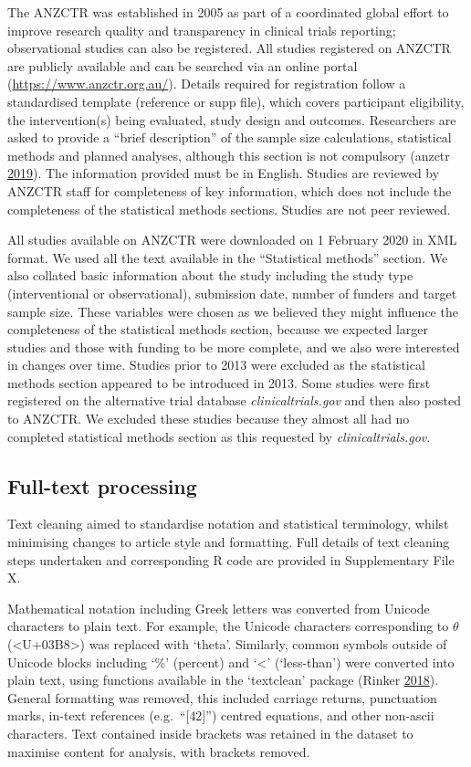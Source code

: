 \documentclass[
]{article}
\begin{document}
The ANZCTR was established in 2005 as part of a coordinated global
effort to improve research quality and transparency in clinical trials
reporting; observational studies can also be registered. All studies
registered on ANZCTR are publicly available and can be searched via an
online portal (\url{https://www.anzctr.org.au/}). Details required for
registration follow a standardised template (reference or supp file),
which covers participant eligibility, the intervention(s) being
evaluated, study design and outcomes. Researchers are asked to provide a
``brief description'' of the sample size calculations, statistical
methods and planned analyses, although this section is not compulsory
(anzctr \protect\hyperlink{ref-ANZCTR}{2019}). The information provided
must be in English. Studies are reviewed by ANZCTR staff for
completeness of key information, which does not include the completeness
of the statistical methods sections. Studies are not peer reviewed.

All studies available on ANZCTR were downloaded on 1 February 2020 in
XML format. We used all the text available in the ``Statistical
methods'' section. We also collated basic information about the study
including the study type (interventional or observational), submission
date, number of funders and target sample size. These variables were
chosen as we believed they might influence the completeness of the
statistical methods section, because we expected larger studies and
those with funding to be more complete, and we also were interested in
changes over time. Studies prior to 2013 were excluded as the
statistical methods section appeared to be introduced in 2013. Some
studies were first registered on the alternative trial database
\emph{clinicaltrials.gov} and then also posted to ANZCTR. We excluded
these studies because they almost all had no completed statistical
methods section as this requested by \emph{clinicaltrials.gov}.

\hypertarget{full-text-processing}{%
\subsection{Full-text processing}\label{full-text-processing}}

Text cleaning aimed to standardise notation and statistical terminology,
whilst minimising changes to article style and formatting. Full details
of text cleaning steps undertaken and corresponding R code are provided
in Supplementary File X.

Mathematical notation including Greek letters was converted from Unicode
characters to plain text. For example, the Unicode characters
corresponding to \(\theta\) (\textless U+03B8\textgreater) was replaced
with `theta'. Similarly, common symbols outside of Unicode blocks
including `\%' (percent) and `\textless{}' (`less-than') were converted
into plain text, using functions available in the `textclean' package
(Rinker \protect\hyperlink{ref-textclean}{2018}). General formatting was
removed, this included carriage returns, punctuation marks, in-text
references (e.g.~``{[}42{]}'') centred equations, and other non-ascii
characters. Text contained inside brackets was retained in the dataset
to maximise content for analysis, with brackets removed.
\end{document}
